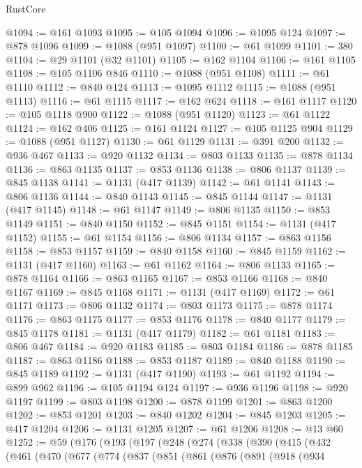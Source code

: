 \begin{lexlean}{RustCore}
\begin{coremodule}
@1094 := @161 @1093
@1095 := @105 @1094
@1096 := @1095 @124
@1097 := @878 @1096
@1099 := @1088 (@951 @1097)
@1100 := @61 @1099
@1101 := 380
@1104 := @29 @1101 (@32 @1101)
@1105 := @162 @1104
@1106 := @161 @1105
@1108 := @105 @1106 @846
@1110 := @1088 (@951 @1108)
@1111 := @61 @1110
@1112 := @840 @124
@1113 := @1095 @1112
@1115 := @1088 (@951 @1113)
@1116 := @61 @1115
@1117 := @162 @624
@1118 := @161 @1117
@1120 := @105 @1118 @900
@1122 := @1088 (@951 @1120)
@1123 := @61 @1122
@1124 := @162 @406
@1125 := @161 @1124
@1127 := @105 @1125 @904
@1129 := @1088 (@951 @1127)
@1130 := @61 @1129
@1131 := @391 @200
@1132 := @936 @467
@1133 := @920 @1132
@1134 := @803 @1133
@1135 := @878 @1134
@1136 := @863 @1135
@1137 := @853 @1136
@1138 := @806 @1137
@1139 := @845 @1138
@1141 := @1131 (@417 @1139)
@1142 := @61 @1141
@1143 := @806 @1136
@1144 := @840 @1143
@1145 := @845 @1144
@1147 := @1131 (@417 @1145)
@1148 := @61 @1147
@1149 := @806 @1135
@1150 := @853 @1149
@1151 := @840 @1150
@1152 := @845 @1151
@1154 := @1131 (@417 @1152)
@1155 := @61 @1154
@1156 := @806 @1134
@1157 := @863 @1156
@1158 := @853 @1157
@1159 := @840 @1158
@1160 := @845 @1159
@1162 := @1131 (@417 @1160)
@1163 := @61 @1162
@1164 := @806 @1133
@1165 := @878 @1164
@1166 := @863 @1165
@1167 := @853 @1166
@1168 := @840 @1167
@1169 := @845 @1168
@1171 := @1131 (@417 @1169)
@1172 := @61 @1171
@1173 := @806 @1132
@1174 := @803 @1173
@1175 := @878 @1174
@1176 := @863 @1175
@1177 := @853 @1176
@1178 := @840 @1177
@1179 := @845 @1178
@1181 := @1131 (@417 @1179)
@1182 := @61 @1181
@1183 := @806 @467
@1184 := @920 @1183
@1185 := @803 @1184
@1186 := @878 @1185
@1187 := @863 @1186
@1188 := @853 @1187
@1189 := @840 @1188
@1190 := @845 @1189
@1192 := @1131 (@417 @1190)
@1193 := @61 @1192
@1194 := @899 @962
@1196 := @105 @1194 @124
@1197 := @936 @1196
@1198 := @920 @1197
@1199 := @803 @1198
@1200 := @878 @1199
@1201 := @863 @1200
@1202 := @853 @1201
@1203 := @840 @1202
@1204 := @845 @1203
@1205 := @417 @1204
@1206 := @1131 @1205
@1207 := @61 @1206
@1208 := @13 @60
@1252 := @59
    (@176
      (@193
        (@197
          (@248
            (@274
              (@338
                (@390
                  (@415
                    (@432
                      (@461
                        (@470
                          (@677
                            (@774
                              (@837
                                (@851
                                  (@861
                                    (@876
                                      (@891
                                        (@918
                                          (@934

\end{coremodule}
\end{lexlean}
